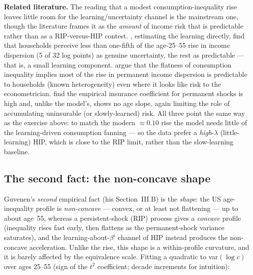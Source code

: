 \documentclass[11pt,fleqn]{article}
\begin{document}
\textbf{Related literature.} The reading that a modest consumption-inequality rise leaves
little room for the learning/uncertainty channel is the mainstream one, though the
literature frames it as the \emph{amount} of income risk that is predictable rather than as
a RIP-versus-HIP contest. \cite{GuvenenSmith2014}, estimating the learning directly, find
that households perceive less than one-fifth of the age-25--55 rise in income dispersion (5
of 32 log points) as genuine uncertainty, the rest as predictable --- that is, a small
learning component. \cite{PrimicerivanRens2009} argue that the flatness of consumption
inequality implies most of the rise in permanent income dispersion is predictable to
households (known heterogeneity) even where it looks like risk to the econometrician.
\cite{KaplanViolante2010} find the empirical insurance coefficient for permanent shocks is
high and, unlike the model's, shows no age slope, again limiting the role of accumulating
uninsurable (or slowly-learned) risk. All three point the same way as the exercise above: to
match the modern $\approx0.10$ rise the model needs little of the learning-driven
consumption fanning --- so the data prefer a \emph{high}-$\lambda$ (little-learning) HIP,
which is close to the RIP limit, rather than the slow-learning baseline.

\subsection{The second fact: the non-concave shape}
\label{app:shape}
Guvenen's \emph{second} empirical fact (his Section~III.B) is the \emph{shape}: the US
age-inequality profile is \emph{non-concave} --- convex, or at least not flattening --- up
to about age~55, whereas a persistent-shock (RIP) process gives a \emph{concave} profile
(inequality rises fast early, then flattens as the permanent-shock variance saturates), and
the learning-about-$\beta^i$ channel of HIP instead produces the non-concave acceleration.
Unlike the rise, this shape is a within-profile curvature, and it is barely affected by the
equivalence scale. Fitting a quadratic to var$(\log c)$ over ages 25--55 (sign of the $t^2$
coefficient; decade increments for intuition):
\end{document}
